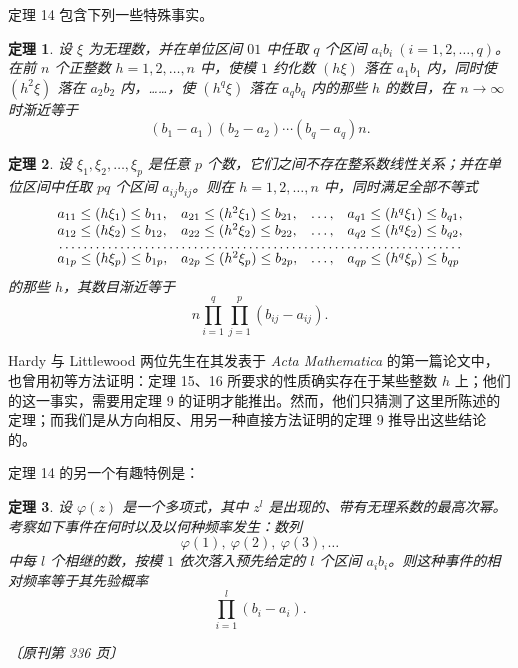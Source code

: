 \documentclass[UTF8,11pt,a4paper,fontset=none]{ctexart}
\theoremstyle{weylthm}
\newtheorem{theorem}{定理}
\newcommand{\origpage}[1]{%
  \par\vspace{0.7em}\noindent\hfill{\small\itshape〔原刊第 #1 页〕}\par\vspace{0.25em}}
\begin{document}
定理 14 包含下列一些特殊事实。

\begin{theorem}
设 \(\xi\) 为无理数，并在单位区间 \(01\) 中任取 \(q\) 个区间
\(a_i b_i\ (i=1,2,\ldots,q)\)。在前 \(n\) 个正整数
\(h=1,2,\ldots,n\) 中，使模 \(1\) 约化数 \((h\xi)\) 落在
\(a_1b_1\) 内，同时使 \((h^2\xi)\) 落在 \(a_2b_2\) 内，……，使
\((h^q\xi)\) 落在 \(a_qb_q\) 内的那些 \(h\) 的数目，在
\(n\to\infty\) 时渐近等于
\[
  (b_1-a_1)(b_2-a_2)\cdots(b_q-a_q)n.
\]
\end{theorem}

\begin{theorem}
设 \(\xi_1,\xi_2,\ldots,\xi_p\) 是任意 \(p\) 个数，它们之间不存在整系数线性关系；并在单位区间中任取 \(pq\) 个区间
\(a_{ij}b_{ij}\)。则在 \(h=1,2,\ldots,n\) 中，同时满足全部不等式
\[
\begin{array}{llll}
 a_{11}\leq(h\xi_1)\leq b_{11},&
 a_{21}\leq(h^2\xi_1)\leq b_{21},&\ldots,&
 a_{q1}\leq(h^q\xi_1)\leq b_{q1},\\
 a_{12}\leq(h\xi_2)\leq b_{12},&
 a_{22}\leq(h^2\xi_2)\leq b_{22},&\ldots,&
 a_{q2}\leq(h^q\xi_2)\leq b_{q2},\\[-0.2em]
 \multicolumn{4}{c}{\dotfill}\\[-0.2em]
 a_{1p}\leq(h\xi_p)\leq b_{1p},&
 a_{2p}\leq(h^2\xi_p)\leq b_{2p},&\ldots,&
 a_{qp}\leq(h^q\xi_p)\leq b_{qp}
\end{array}
\]
的那些 \(h\)，其数目渐近等于
\[
  n\prod_{i=1}^{q}\prod_{j=1}^{p}(b_{ij}-a_{ij}).
\]
\end{theorem}

Hardy 与 Littlewood 两位先生在其发表于 \emph{Acta Mathematica} 的第一篇论文中，也曾用初等方法证明：定理 15、16 所要求的性质确实存在于某些整数 \(h\) 上；他们的这一事实，需要用定理 9 的证明才能推出。然而，他们只猜测了这里所陈述的定理；而我们是从方向相反、用另一种直接方法证明的定理 9 推导出这些结论的。

定理 14 的另一个有趣特例是：

\begin{theorem}
设 \(\varphi(z)\) 是一个多项式，其中 \(z^l\) 是出现的、带有无理系数的最高次幂。考察如下事件在何时以及以何种频率发生：数列
\[
  \varphi(1),\ \varphi(2),\ \varphi(3),\ldots
\]
中每 \(l\) 个相继的数，按模 \(1\) 依次落入预先给定的 \(l\) 个区间
\(a_i b_i\)。则这种事件的相对频率等于其先验概率
\[
  \prod_{i=1}^{l}(b_i-a_i).
\]
\end{theorem}

\origpage{336}
\end{document}
